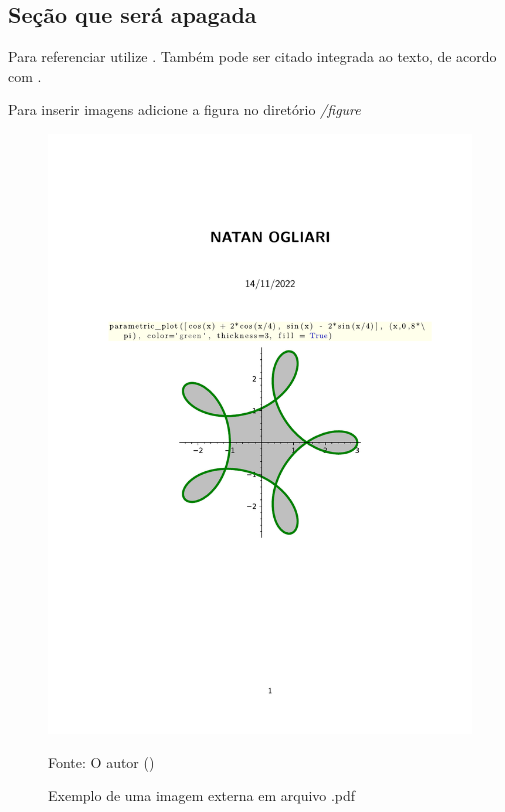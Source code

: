 \subsection{Seção que será apagada}

Para referenciar utilize \cite{ninguem2022curioso}. Também pode ser citado integrada ao texto, de acordo com .

Para inserir imagens adicione a figura no diretório \textit{/figure}

\begin{figure}[H]
\centering
\caption{Exemplo de uma imagem externa em arquivo .pdf}
\includegraphics[width=1\textwidth]{figure/Welcome to CoCalc.pdf}
\label{fig:imagem_massa}

\raggedright{\fontsize{10pt}{\baselineskip}\selectfont Fonte: O autor (\ano)}

\end{figure}

